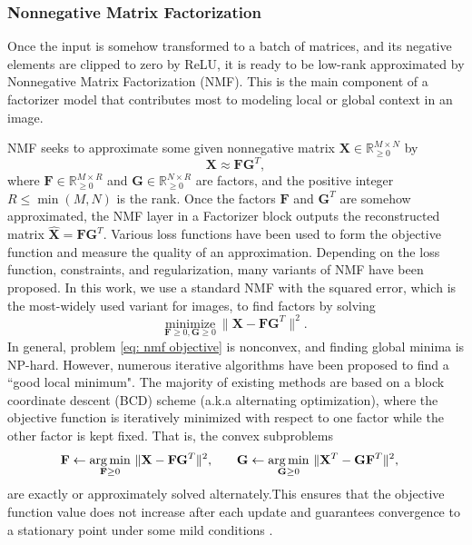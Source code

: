 \documentclass[a4,12pt]{article}
\begin{document}
	\subsubsection{Nonnegative Matrix Factorization} \label{sec: nmf}
	
	Once the input is somehow transformed to a batch of matrices, and its negative elements are clipped to zero by ReLU, it is ready to be low-rank approximated by Nonnegative Matrix Factorization (NMF). This is the main component of a factorizer model that contributes most to modeling local or global context in an image.  
	
	NMF \citep{lee1999learning} seeks to approximate some given nonnegative matrix $ \mathbf{X} \in \mathbb{R}_{\ge 0}^{M \times N} $ by 
	\begin{equation}
		\label{eq: nmf}
		\mathbf{X} \approx \mathbf{F} \mathbf{G}^T,
	\end{equation}
	where $ \mathbf{F} \in \mathbb{R}_{\ge 0}^{M \times R} $ and $ \mathbf{G} \in \mathbb{R}_{\ge 0}^{N \times R} $ are factors, and the positive integer $ R \leq \min(M, N) $ is the rank. Once the factors $ \mathbf{F} $ and $ \mathbf{G}^T $ are somehow approximated, the NMF layer in a Factorizer block outputs the reconstructed matrix $ \hat{\mathbf{X}} = \mathbf{F} \mathbf{G}^T $. Various loss functions have been used to form the objective function and measure the quality of an approximation. Depending on the loss function, constraints, and regularization, many variants of NMF have been proposed. In this work, we use a standard NMF with the squared error, which is the most-widely used variant for images, to find factors by solving
	\begin{equation}
		\label{eq: nmf objective}
		\underset{\mathbf{F} \geq 0, \mathbf{G} \geq 0}{\text{minimize}} \ \lVert \mathbf{X} - \mathbf{F} \mathbf{G}^T \rVert^2.
	\end{equation}
	In general, problem \eqref{eq: nmf objective} is nonconvex, and finding global minima is NP-hard. However, numerous iterative algorithms have been proposed to find a ``good local minimum". The  majority of existing methods are based on a block coordinate descent (BCD) scheme (a.k.a alternating optimization), where the objective function is iteratively minimized with respect to one factor while the other factor is kept fixed. That is, the convex subproblems
	\begin{align}
		\label{eq: nmf bcd subproblems} 
		\mathbf{F} \gets \underset{\mathbf{F} \geq 0}{\operatorname*{arg\,min}} \ \lVert \mathbf{X} - \mathbf{F} \mathbf{G}^T  \rVert^2, \qquad & 
		\mathbf{G} \gets \underset{\mathbf{G} \geq 0}{\operatorname*{arg\,min}} \ \lVert \mathbf{X}^T - \mathbf{G} \mathbf{F}^T \rVert^2,
	\end{align}
	are exactly or approximately solved alternately.This ensures that the objective function value does not increase after each update and guarantees convergence to a stationary point under some mild conditions \citep{grippo2000convergence}. 
	
\end{document}
